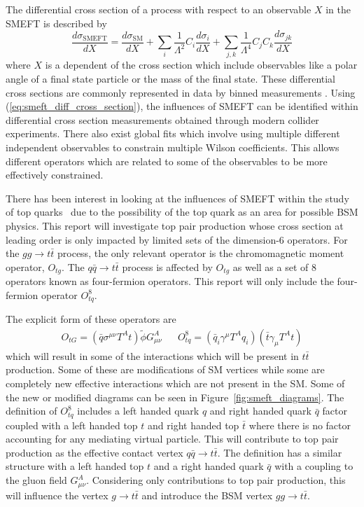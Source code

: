 \documentclass[a4paper,11pt]{article}
\begin{document}
The differential cross section of a process with respect to an observable $X$ in the SMEFT is described by
\begin{equation}\label{eq:smeft_diff_cross_section}
    \frac{d\sigma_{\text{SMEFT}}}{dX} = \frac{d\sigma_{\text{SM}}}{dX} + \sum\limits_{i} \frac{1}{\Lambda^2} C_{i} \frac{d\sigma_{i}}{dX} + \sum\limits_{j,k} \frac{1}{\Lambda^4} C_{j} C_{k} \frac{d\sigma_{j k}}{dX}
\end{equation}
where $X$ is a dependent of the cross section which include observables like a polar angle of a final state particle or the mass of the final state.
These differential cross sections are commonly represented in data by binned measurements .
Using (\ref{eq:smeft_diff_cross_section}), the influences of SMEFT can be identified within differential cross section measurements obtained through modern collider experiments.
There also exist global fits which involve using multiple different independent observables to constrain multiple Wilson coefficients.
This allows different operators which are related to some of the observables to be more effectively constrained.

There has been interest in looking at the influences of SMEFT within the study of top quarks~\cite{Hartland_2019,Buckley_2015,Brivio_2020} due to the possibility of the top quark as an area for possible BSM physics.
This report will investigate top pair production whose cross section at leading order is only impacted by limited sets of the dimension-6 operators. For the $gg \rightarrow t\bar{t}$ process, the only relevant operator is the chromomagnetic moment operator, $O_{tg}$.
The $q\bar{q} \rightarrow t\bar{t}$ process is affected by $O_{tg}$ as well as a set of 8 operators known as four-fermion operators.
This report will only include the four-fermion operator $O_{tq}^{8}$.

The explicit form of these operators are
\begin{align*}
    O_{tG} = (\bar{q} \sigma^{\mu \nu} T^{A} t) \tilde{\phi} G^{A}_{\mu \nu} && O_{tq}^{8} = (\bar{q}_{i} \gamma^{\mu} T^{A} q_{i})(\bar{t} \gamma_{\mu} T^{A} t)
\end{align*}
which will result in some of the interactions which will be present in $t\bar{t}$ production.
Some of these are modifications of SM vertices while some are completely new effective interactions which are not present in the SM.
Some of the new or modified diagrams can be seen in Figure~\ref{fig:smeft_diagrams}.
The definition of $O_{tq}^{8}$ includes a left handed quark $q$ and right handed quark $\bar{q}$ factor coupled with a left handed top $t$ and right handed top $\bar{t}$ where there is no factor accounting for any mediating virtual particle.
This will contribute to top pair production as the effective contact vertex $q\bar{q} \rightarrow t\bar{t}$.
The definition has a similar structure with a left handed top $t$ and a right handed quark $\bar{q}$ with a coupling to the gluon field $G^{A}_{\mu \nu}$.
Considering only contributions to top pair production, this will influence the vertex $g \rightarrow t\bar{t}$ and introduce the BSM vertex $gg \rightarrow t\bar{t}$.
\end{document}
